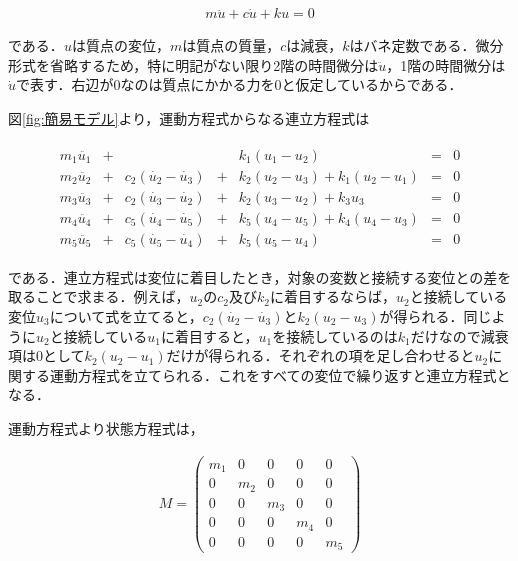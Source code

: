 \begin{eqnarray}
    m\ddot{u} + c\dot{u} + ku = 0
\end{eqnarray}

である．$u$は質点の変位，$m$は質点の質量，$c$は減衰，$k$はバネ定数である．微分形式を省略するため，特に明記がない限り2階の時間微分は$\ddot{u}$，1階の時間微分は$\dot{u}$で表す．右辺が$0$なのは質点にかかる力を$0$と仮定しているからである．

図\ref{fig:簡易モデル}より，運動方程式からなる連立方程式は

\begin{eqnarray}
    \begin{matrix}
        m_1 \ddot{u_1} &+&  & & k_1 (u_1 - u_2) &=& 0 \\ 
        m_2 \ddot{u_2} &+& c_2(\dot{u_2} - \dot{u_3}) &+& k_2 (u_2 - u_3) + k_1 (u_2 - u_1) &=& 0 \\ 
        m_3 \ddot{u_3} &+& c_2(\dot{u_3} - \dot{u_2}) &+& k_2 (u_3 - u_2) + k_3 u_3 &=& 0 \\ 
        m_4 \ddot{u_4} &+& c_5(\dot{u_4} - \dot{u_5}) &+& k_5 (u_4 - u_5) + k_4 (u_4 - u_3) &=& 0 \\ 
        m_5 \ddot{u_5} &+& c_5(\dot{u_5} - \dot{u_4}) &+& k_5 (u_5 - u_4) &=& 0
    \end{matrix}        
\end{eqnarray}

である．連立方程式は変位に着目したとき，対象の変数と接続する変位との差を取ることで求まる．例えば，$u_2$の$c_2$及び$k_2$に着目するならば，$u_2$と接続している変位$u_3$について式を立てると，$c_2(\dot{u_2} - \dot{u_3})$と$k_2(u_2 - u_3)$が得られる．同じように$u_2$と接続している$u_1$に着目すると，$u_1$を接続しているのは$k_1$だけなので減衰項は$0$として$k_2(u_2 - u_1)$だけが得られる．それぞれの項を足し合わせると$u_2$に関する運動方程式を立てられる．これをすべての変位で繰り返すと連立方程式となる．

運動方程式より状態方程式は，

\begin{eqnarray}
    M = 
    \left(\begin{matrix}
        m_1 & 0   & 0   & 0   & 0     \\
        0   & m_2 & 0   & 0   & 0     \\
        0   & 0   & m_3 & 0   & 0     \\
        0   & 0   & 0   & m_4 & 0     \\
        0   & 0   & 0   & 0   & m_5 
    \end{matrix}\right)
\end{eqnarray}

